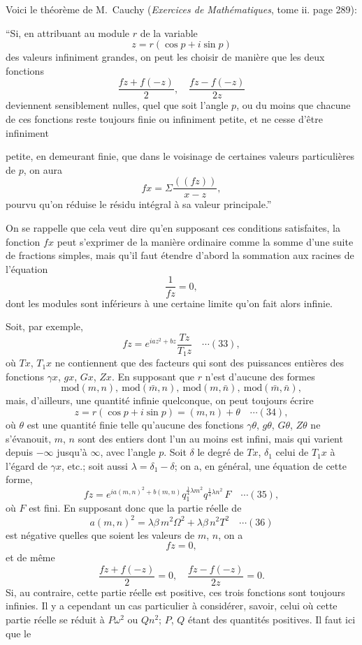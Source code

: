 \documentclass[12pt,a4paper]{article}
\begin{document}
Voici le th\'eor\`eme de M.~Cauchy (\textit{Exercices de Math\'ematiques}, tome ii. page 289):

``Si, en attribuant au module $r$ de la variable
\[
z = r(\cos p + i\sin p)
\]
des valeurs infiniment grandes, on peut les choisir de mani\`ere que les deux fonctions
\[
\frac{fz + f(-z)}{2},\quad \frac{fz - f(-z)}{2z}
\]
deviennent sensiblement nulles, quel que soit l'angle $p$, ou du moins que chacune de ces fonctions reste toujours finie ou infiniment petite, et ne cesse d'\^etre infiniment

\newpage
\setcounter{page}{175}

petite, en demeurant finie, que dans le voisinage de certaines valeurs particuli\`eres de $p$, on aura
\[
fx = \Sigma\frac{((f z))}{x - z},
\]
pourvu qu'on r\'eduise le r\'esidu int\'egral \`a sa valeur principale.''

On se rappelle que cela veut dire qu'en supposant ces conditions satisfaites, la fonction $fx$ peut s'exprimer de la mani\`ere ordinaire comme la somme d'une suite de fractions simples, mais qu'il faut \'etendre d'abord la sommation aux racines de l'\'equation
\[
\frac{1}{fz} = 0,
\]
dont les modules sont inf\'erieurs \`a une certaine limite qu'on fait alors infinie.

Soit, par exemple,
\[
fz = e^{ia z^2 + bz}\frac{Tz}{T_1 z} \quad\cdots(33),
\]
o\`u $Tx$, $T_1 x$ ne contiennent que des facteurs qui sont des puissances enti\`eres des fonctions $\gamma x$, $g x$, $G x$, $Z x$. En supposant que $r$ n'est d'aucune des formes
\[
\mathrm{mod}(m, n),\ \mathrm{mod}(\bar m, n),\ \mathrm{mod}(m, \bar n),\ \mathrm{mod}(\bar m, \bar n),
\]
mais, d'ailleurs, une quantit\'e infinie quelconque, on peut toujours \'ecrire
\[
z = r(\cos p + i\sin p) = (m, n) + \theta \quad\cdots(34),
\]
o\`u $\theta$ est une quantit\'e finie telle qu'aucune des fonctions $\gamma\theta$, $g\theta$, $G\theta$, $Z\theta$ ne s'\'evanouit, $m$, $n$ sont des entiers dont l'un au moins est infini, mais qui varient depuis $-\infty$ jusqu'\`a $\infty$, avec l'angle $p$. Soit $\delta$ le degr\'e de $T x$, $\delta_1$ celui de $T_1 x$ \`a l'\'egard de $\gamma x$, etc.; soit aussi $\lambda = \delta_1 - \delta$; on a, en g\'en\'eral, une \'equation de cette forme,
\[
fz = e^{ia(m,n)^2 + b(m,n)}q_1^{\frac14\lambda m^2}q^{\frac14\lambda n^2}\,F \quad\cdots(35),
\]
o\`u $F$ est fini. En supposant donc que la partie r\'eelle de
\[
a(m, n)^2 = \lambda\beta\,m^2\Omega^2 + \lambda\beta\,n^2 T^2 \quad\cdots(36)
\]
est n\'egative quelles que soient les valeurs de $m$, $n$, on a
\[
fz = 0,
\]
et de m\^eme
\[
\frac{fz + f(-z)}{2} = 0,\quad \frac{fz - f(-z)}{2z} = 0.
\]
Si, au contraire, cette partie r\'eelle est positive, ces trois fonctions sont toujours infinies. Il y a cependant un cas particulier \`a consid\'erer, savoir, celui o\`u cette partie r\'eelle se r\'eduit \`a $P\omega^2$ ou $Q n^2$; $P$, $Q$ \'etant des quantit\'es positives. Il faut ici que le
\end{document}
